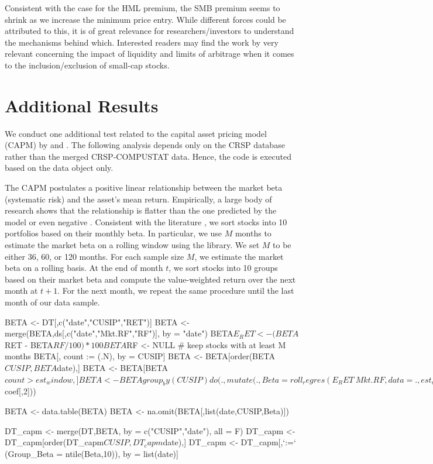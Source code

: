 Consistent with the case for the HML premium, the SMB premium seems to shrink as we increase the minimum price entry. While different forces could be attributed to this, it is of great relevance for researchers/investors to understand the mechanisms behind which. Interested readers may find the work by \citet{li2014limits} very relevant concerning the impact of liquidity and limits of arbitrage when it comes to the inclusion/exclusion of small-cap stocks.



\color{black}
\section{Additional Results}
We conduct one additional test related to the capital asset pricing model (CAPM) by \cite{sharpe1964capital} and \cite{lintner1965valuation}. The following analysis depends only on the CRSP database rather than the merged CRSP-COMPUSTAT data. Hence, the code is executed based on the  data object only. 

The CAPM postulates a positive linear relationship between the market beta (systematic risk) and the asset's mean return. 
Empirically, a large body of research shows that the relationship is flatter than the one predicted by the model \citep{jensen1972capital} or even negative \citep{frazzini2014betting}.  Consistent with the literature \citep{bali2016empirical}, we sort stocks into 10 portfolios based on their monthly beta. 
In particular, we use $M$ months to estimate the market beta on a rolling window using the     \citep{rollRegress} library. We set $M$ to be either 36, 60, or 120 months. For each sample size $M$, we estimate the market beta on a rolling basis. At the end of month $t$, we sort stocks into 10 groups based on their market beta and compute the value-weighted return over the next month at $t+1$. For the next month, we repeat the same procedure until the last month of our data sample. 



\begin{Schunk}
\begin{Sinput}

BETA <- DT[,c("date","CUSIP","RET")]
BETA <- merge(BETA,ds[,c("date","Mkt.RF","RF")], by = "date")
BETA$E_RET <- (BETA$RET - BETA$RF/100)*100
BETA$RF <- NULL
# keep stocks with at least M months
BETA[, count := (.N), by = CUSIP]
BETA <- BETA[order(BETA$CUSIP,BETA$date),]
BETA <- BETA[BETA$count   > est_window,]

BETA <- BETA %
  group_by(CUSIP) %
  do(.,mutate(.,Beta = roll_regres(E_RET ~ Mkt.RF,data = .,est_window)$coef[,2]))

BETA <- data.table(BETA)
BETA <- na.omit(BETA[,list(date,CUSIP,Beta)])

DT_capm <- merge(DT,BETA, by = c("CUSIP","date"), all = F)
DT_capm <- DT_capm[order(DT_capm$CUSIP,DT_capm$date),]
DT_capm <- DT_capm[,`:=` (Group_Beta = ntile(Beta,10)), by = list(date)]

\end{Sinput}
\end{Schunk}






